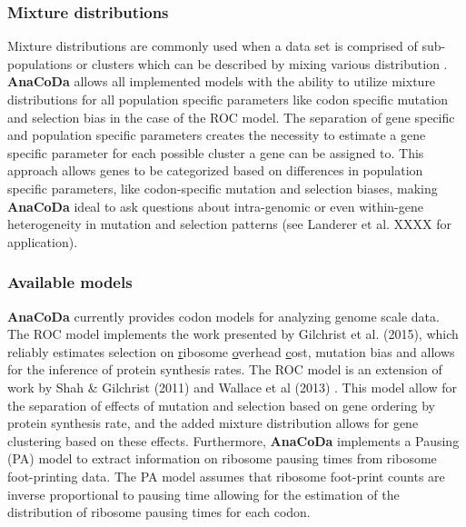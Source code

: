 \documentclass{bioinfo}
\newcommand{\package}{\textbf{AnaCoDa }} %
\begin{document}
\subsubsection*{Mixture distributions}
Mixture distributions are commonly used when a data set is comprised of sub-populations or clusters which can be described by mixing various distribution \citep{gelman2013}. 
\package allows all implemented models with the ability to utilize mixture distributions for all population specific parameters like codon specific mutation and selection bias in the case of the ROC model. 
The separation of gene specific and population specific parameters creates the necessity to estimate a gene specific parameter for each possible cluster a gene can be assigned to. 
This approach allows genes to be categorized based on differences in population specific parameters, like codon-specific mutation and selection biases, making \package ideal to ask questions about intra-genomic or even within-gene heterogeneity in mutation and selection patterns (see Landerer et al. XXXX for application). 

 
\subsubsection*{Available models}
\package currently provides codon models for analyzing genome scale data.
The ROC model implements the work presented by Gilchrist et al. (2015), which reliably estimates selection on \underline{r}ibosome \underline{o}verhead \underline{c}ost, mutation bias and allows for the inference of protein synthesis rates. The ROC model is an extension of work by Shah \& Gilchrist (2011) \citep{shah2011} and  Wallace et al (2013) \citep{wallace2013}. 
This model allow for the separation of effects of mutation and selection based on gene ordering by protein synthesis rate, and the added mixture distribution allows for gene clustering based on these effects.
Furthermore, \package implements a Pausing (PA) model to extract information on ribosome pausing times from ribosome foot-printing data. The PA model assumes that ribosome foot-print counts are inverse proportional to pausing time allowing for the estimation of the distribution of ribosome pausing times for each codon. 
\end{document}
